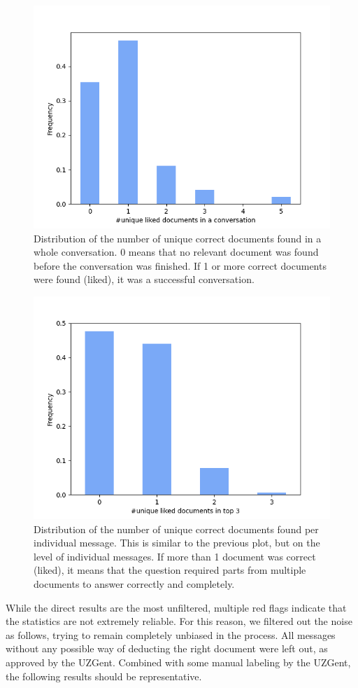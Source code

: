 \begin{figure}[H]
    \centerline{\includegraphics[width=0.7\linewidth]{fig/RAG_nr_correct_in_conversation.png}}
    \caption{Distribution of the number of unique correct documents found in a whole conversation. 0 means that no relevant document was found before the conversation was finished. If 1 or more correct documents were found (liked), it was a successful conversation.}
    \label{fig:liked_docs_per_convo}
\end{figure}

\begin{figure}[H]
    \centerline{\includegraphics[width=0.7\linewidth]{fig/RAG_nr_top_3.png}}
    \caption{Distribution of the number of unique correct documents found per individual message. This is similar to the previous plot, but on the level of individual messages. If more than 1 document was correct (liked), it means that the question required parts from multiple documents to answer correctly and completely.}
    \label{fig:liked_docs}
\end{figure}

While the direct results are the most unfiltered, multiple red flags indicate that the statistics are not extremely reliable. For this reason, we filtered out the noise as follows, trying to remain completely unbiased in the process. All messages without any possible way of deducting the right document were left out, as approved by the UZGent. Combined with some manual labeling by the UZGent, the following results should be representative.

